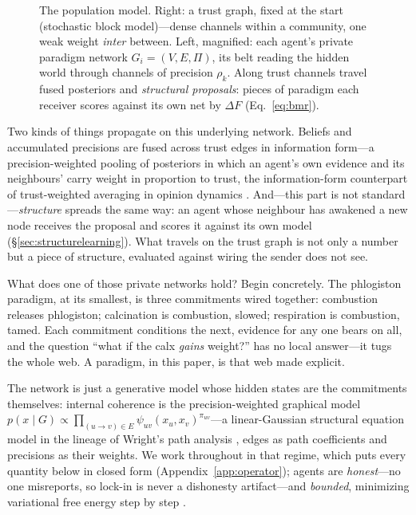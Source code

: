 \documentclass[runningheads]{llncs}
\begin{document}
\begin{figure}[h!]
{}
\caption{The population model. Right: a trust graph, fixed at the start (stochastic block
model)---dense channels within a community, one weak weight \emph{inter} between. Left,
magnified: each agent's private paradigm network $G_i=(V,E,\Pi)$, its belt reading the hidden
world through channels of precision $\rho_k$. Along trust channels travel fused posteriors and
\emph{structural proposals}: pieces of paradigm each receiver scores against its own net by
$\Delta F$ (Eq.~\ref{eq:bmr}).}
\label{fig:population}
\end{figure}

Two kinds of things propagate on this underlying network. Beliefs and accumulated precisions are
fused across trust edges in information form---a precision-weighted pooling of posteriors in which
an agent's own evidence and its neighbours' carry weight in proportion to trust, the
information-form counterpart of trust-weighted averaging in opinion dynamics
\citep{degroot1974,acemoglu2011}. And---this part is not standard---\emph{structure} spreads the
same way: an agent whose neighbour has awakened a new node receives the proposal and scores it
against its own model (\S\ref{sec:structurelearning}). What travels on the trust graph is not only
a number but a piece of structure, evaluated against wiring the sender does not see.

What does one of those private networks hold? Begin concretely. The
phlogiston paradigm, at its smallest, is three commitments wired together:
combustion releases phlogiston; calcination is combustion, slowed; respiration is combustion,
tamed. Each commitment conditions the next, evidence for any one bears on all, and the question
``what if the calx \emph{gains} weight?'' has no local answer---it tugs the whole web. A
paradigm, in this paper, is that web made explicit.

The network is just a generative model whose hidden states are the commitments themselves:
internal coherence is the precision-weighted graphical model $p(x\mid
G)\propto\prod_{(u\to v)\in E}\psi_{uv}(x_u,x_v)^{\pi_{uv}}$---a linear-Gaussian structural
equation model in the lineage of Wright's path analysis \citep{wright1934}, edges as path
coefficients and precisions as their weights. We work throughout in that regime, which puts
every quantity below in closed form (Appendix~\ref{app:operator}); agents are
\emph{honest}---no one misreports, so lock-in is never a dishonesty artifact---and
\emph{bounded}, minimizing variational free energy step by step \citep{dacosta2020}.
\end{document}
